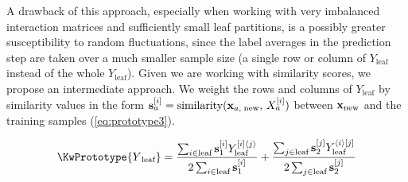 A drawback of this approach, especially when working with very imbalanced interaction matrices and sufficiently small leaf partitions, is a possibly greater susceptibility to random fluctuations, since the label averages in the prediction step are taken over a much smaller sample size (a single row or column of $Y_\text{leaf}$ instead of the whole $Y_\text{leaf}$). 
Given we are working with similarity scores, we propose an intermediate approach. We weight the rows and columns of $Y_\text{leaf}$ by similarity values in the form $\mathbf{s}_a^{[i]} = \text{similarity}(\mathbf{x}_{a,\;\text{new}}, \, X_a^{[i]})$ between $\mathbf{x}_\text{new}$ and the training samples (\autoref{eq:prototype3}).

\begin{equation}
    \KwPrototype{Y\textsubscript{leaf}}
    = \frac{
        \sum_{i\in \text{leaf}}
            \mathbf{s}_1\el i
            Y_\text{leaf}^{[i]\ang j}
    }{
        2\sum_{i\in \text{leaf}}
            \mathbf{s}_{1}\el i
    }
    +
    \frac{
        \sum_{j\in \text{leaf}}
            \mathbf{s}_{2}\el j
            Y_\text{leaf}^{\ang i[j]}
    }{
        2\sum_{j\in \text{leaf}}
            \mathbf{s}_{2}\el j
    }
    \label{eq:prototype3}
\end{equation}


